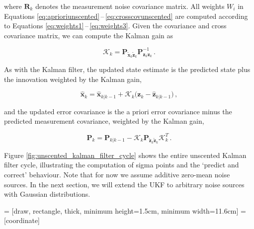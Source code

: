 \noindent
where $\bm{R}_k$ denotes the measurement noise covariance matrix. All weights $W_i$ in Equations \ref{eq:aprioriunscented}\,--\,\ref{eq:crosscovunscented} are computed according to Equations \ref{eq:weights1}\,--\,\ref{eq:weights3}. Given the covariance and cross covariance matrix, we can compute the Kalman gain as
 
\begin{equation}
  \mathcal{K}_k = \bm{P}_{\tilde{\bm{x}}_k \tilde{\bm{z}}_k}\bm{P}^{-1}_{\bm{z}_k\bm{z}_k}\,.
\end{equation}

As with the Kalman filter, the updated state estimate is the predicted state plus the innovation weighted by the Kalman gain,

\begin{equation}
  \hat{\bm{x}}_k = \hat{\bm{x}}_{k|k-1} + \mathcal{K}_k\big(\bm{z}_k - \hat{\bm{z}}_{k|k-1}\big)\,,
\end{equation}

\noindent
and the updated error covariance is the a priori error covariance minus the predicted measurement covariance, weighted by the Kalman gain,

\begin{equation}
  \bm{P}_k = \bm{P}_{k|k-1} - \mathcal{K}_k \bm{P}_{\tilde{\bm{z}}_k \tilde{\bm{z}}_k} \mathcal{K}^T_k\,.
\end{equation}


Figure \ref{fig:unscented_kalman_filter_cycle} shows the entire unscented Kalman filter cycle, illustrating the computation of sigma points and the `predict and correct' behaviour. Note that for now we assume additive zero-mean noise sources. In the next section, we will extend the UKF to arbitrary noise sources with Gaussian distributions.


 = [draw, rectangle, thick, 
    minimum height=1.5cm, minimum width=11.6cm]
 = [coordinate]

